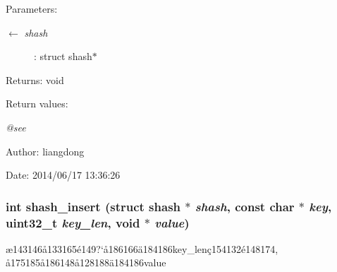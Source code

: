 \begin{Desc}
\item[Parameters:]
\begin{description}
\item[\mbox{$\leftarrow$} {\em shash}]: struct shash$\ast$ \end{description}
\end{Desc}
\begin{Desc}
\item[Returns:]void \end{Desc}
\begin{Desc}
\item[Return values:]
\begin{description}
\item[{\em @see}]\end{description}
\end{Desc}
\begin{Desc}
\item[Author:]liangdong \end{Desc}
\begin{Desc}
\item[Date:]2014/06/17 13:36:26 \end{Desc}
\subsubsection{\setlength{\rightskip}{0pt plus 5cm}int shash\_\-insert (struct shash $\ast$ {\em shash}, const char $\ast$ {\em key}, uint32\_\-t {\em key\_\-len}, void $\ast$ {\em value})}\label{shash_8h_a4}


\ae{}143146\aa{}133165\'{e}149?`\aa{}186166\"{a}184186key\_\-len\c{c}154132\'{e}148174, \aa{}175185\aa{}186148\aa{}128188\"{a}184186value 

